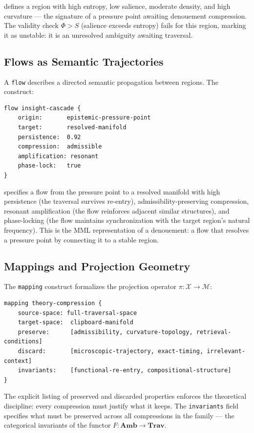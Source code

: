 \documentclass[12pt,oneside]{book}
\theoremstyle{plain}
\theoremstyle{definition}
\theoremstyle{plain}
\newcommand{\Trav}{\mathbf{Trav}}
\newcommand{\Amb}{\mathbf{Amb}}
\newcommand{\cM}{\mathcal{M}}
\newcommand{\cX}{\mathcal{X}}
\begin{document}
defines a region with high entropy, low salience, moderate density, and high curvature — the signature of a pressure point awaiting denouement compression. The validity check $\Phi > S$ (salience exceeds entropy) fails for this region, marking it as unstable: it is an unresolved ambiguity awaiting traversal.

\subsection{Flows as Semantic Trajectories}

A \texttt{flow} describes a directed semantic propagation between regions. The construct:

\begin{lstlisting}
flow insight-cascade {
    origin:       epistemic-pressure-point
    target:       resolved-manifold
    persistence:  0.92
    compression:  admissible
    amplification: resonant
    phase-lock:   true
}
\end{lstlisting}

specifies a flow from the pressure point to a resolved manifold with high persistence (the traversal survives re-entry), admissibility-preserving compression, resonant amplification (the flow reinforces adjacent similar structures), and phase-locking (the flow maintains synchronization with the target region's natural frequency). This is the MML representation of a denouement: a flow that resolves a pressure point by connecting it to a stable region.

\subsection{Mappings and Projection Geometry}

The \texttt{mapping} construct formalizes the projection operator $\pi : \cX \to \cM$:

\begin{lstlisting}
mapping theory-compression {
    source-space: full-traversal-space
    target-space:  clipboard-manifold
    preserve:      [admissibility, curvature-topology, retrieval-conditions]
    discard:       [microscopic-trajectory, exact-timing, irrelevant-context]
    invariants:    [functional-re-entry, compositional-structure]
}
\end{lstlisting}

The explicit listing of preserved and discarded properties enforces the theoretical discipline: every compression must justify what it keeps. The \texttt{invariants} field specifies what must be preserved across all compressions in the family — the categorical invariants of the functor $F : \Amb \to \Trav$.
\end{document}
